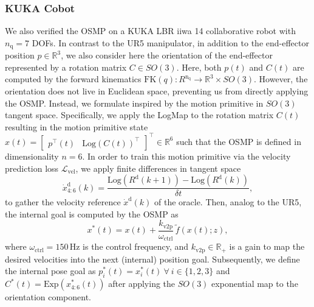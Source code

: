 \subsubsection{KUKA Cobot}
We also verified the \gls{OSMP} on a KUKA LBR iiwa 14 collaborative robot with $n_\mathrm{q} = 7$ DOFs.
In contrast to the UR5 manipulator, in addition to the end-effector position $p \in \mathbb{R}^3$, we also consider here the orientation of the end-effector represented by a rotation matrix $C \in SO(3)$. Here, both $p(t)$ and $C(t)$ are computed by the forward kinematics $\mathrm{FK}(q): R^\mathrm{n_\mathrm{q}} \to \mathbb{R}^3 \times SO(3)$. 
However, the orientation does not live in Euclidean space, preventing us from directly applying the \gls{OSMP}.
Instead, we formulate inspired by \citet{urain2022learning} the motion primitive in $SO(3)$ tangent space. Specifically, we apply the LogMap to the rotation matrix $C(t)$ resulting in the motion primitive state $x(t) = \begin{bmatrix}
    p^\top(t) & \mathrm{Log}(C(t))^\top
\end{bmatrix}^\top \in \mathbb{R}^6$ such that the \gls{OSMP} is defined in dimensionality $n=6$.
In order to train this motion primitive via the velocity prediction loss $\mathcal{L}_\mathrm{vel}$, we apply finite differences in tangent space
\begin{equation}
    \dot{x}_{4:6}^\mathrm{d}(k) = \frac{\mathrm{Log}(R^\mathrm{d}(k+1)) - \mathrm{Log}(R^\mathrm{d}(k))}{\delta t},
\end{equation}
to gather the velocity reference $\dot{x}^\mathrm{d}(k)$ of the oracle.
Then, analog to the UR5, the internal goal is computed by the \gls{OSMP} as
\begin{equation}
    x^*(t) = x(t) + \frac{k_\mathrm{v2p}}{\omega_\mathrm{ctrl}} \, \tilde{f}(x(t); z),
\end{equation}
where $\omega_\mathrm{ctrl} = 150 \, \mathrm{Hz}$ is the control frequency, and $k_\mathrm{v2p} \in \mathbb{R}_+$ is a gain to map the desired velocities into the next (internal) position goal.
Subsequently, we define the internal pose goal as $p_i^*(t) = x_{i}^*(t) \: \forall \: i \in \{1, 2, 3 \}$ and $C^*(t) = \mathrm{Exp}(x_{4:6}^*(t))$ after applying the $SO(3)$ exponential map to the orientation component.
